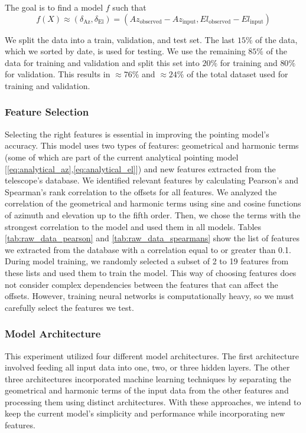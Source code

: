 The goal is to find a model $f$ such that
\begin{equation}
    f(X) \approx (\delta_{\text{Az}}, \delta_{\text{El}}) = (Az_{\text{observed}}-Az_{\text{input}}, El_{\text{observed}}-El_{\text{input}})
\end{equation}

We split the data into a train, validation, and test set.
The last $15\%$ of the data, which we sorted by date, is used for testing.
We use the remaining $85\%$ of the data for training and validation and split this set into $20\%$ for training and $80\%$ for validation.
This results in $\approx 76\%$ and $\approx 24\%$ of the total dataset used for training and validation.

\subsubsection{Feature Selection}
Selecting the right features is essential in improving the pointing model's accuracy.
This model uses two types of features: geometrical and harmonic terms (some of which are part of the current analytical pointing model [\eqref{eq:analytical_az},\eqref{eq:analytical_el}]) and new features extracted from the telescope's database.
We identified relevant features by calculating Pearson's and Spearman's rank correlation to the offsets for all features.
We analyzed the correlation of the geometrical and harmonic terms using sine and cosine functions of azimuth and elevation up to the fifth order.
Then, we chose the terms with the strongest correlation to the model and used them in all models.
Tables \ref{tab:raw_data_pearson} and \ref{tab:raw_data_spearmans} show the list of features we extracted from the database with a correlation equal to or greater than 0.1.
During model training, we randomly selected a subset of 2 to 19 features from these lists and used them to train the model.
This way of choosing features does not consider complex dependencies between the features that can affect the offsets.
However, training neural networks is computationally heavy, so we must carefully select the features we test.

\subsubsection{Model Architecture}
This experiment utilized four different model architectures.
The first architecture involved feeding all input data into one, two, or three hidden layers.
The other three architectures incorporated machine learning techniques by separating the geometrical and harmonic terms of the input data from the other features and processing them using distinct architectures.
With these approaches, we intend to keep the current model's simplicity and performance while incorporating new features.

